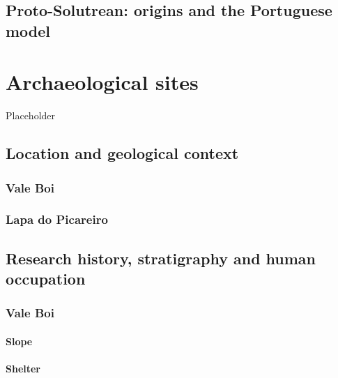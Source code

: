 \documentclass[12pt,twoside]{reedthesis}
\begin{document}
\hypertarget{proto-solutrean-origins-and-the-portuguese-model}{%
\section{Proto-Solutrean: origins and the Portuguese model}\label{proto-solutrean-origins-and-the-portuguese-model}}

\hypertarget{archaeological-sites}{%
\chapter{Archaeological sites}\label{archaeological-sites}}

Placeholder

\hypertarget{location-and-geological-context}{%
\section{Location and geological context}\label{location-and-geological-context}}

\hypertarget{vale-boi}{%
\subsection{Vale Boi}\label{vale-boi}}

\hypertarget{lapa-do-picareiro}{%
\subsection{Lapa do Picareiro}\label{lapa-do-picareiro}}

\hypertarget{research-history-stratigraphy-and-human-occupation}{%
\section{Research history, stratigraphy and human occupation}\label{research-history-stratigraphy-and-human-occupation}}

\hypertarget{vale-boi-1}{%
\subsection{Vale Boi}\label{vale-boi-1}}

\hypertarget{slope}{%
\subsubsection{Slope}\label{slope}}

\hypertarget{shelter}{%
\subsubsection{Shelter}\label{shelter}}
\end{document}
